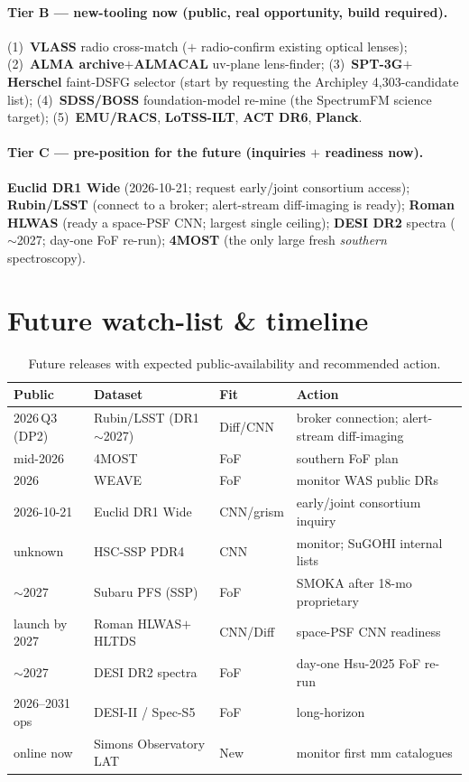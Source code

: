 \documentclass[11pt,letterpaper]{article}
\newcommand{\survey}[1]{\textbf{#1}}
\begin{document}
\paragraph{Tier B --- new-tooling now (public, real opportunity, build required).}
(1)~\survey{VLASS} radio cross-match ($+$ radio-confirm existing optical lenses);
(2)~\survey{ALMA archive}$+$\survey{ALMACAL} uv-plane lens-finder; (3)~\survey{SPT-3G}$+$%
\survey{Herschel} faint-DSFG selector (start by requesting the Archipley 4{,}303-candidate list);
(4)~\survey{SDSS/BOSS} foundation-model re-mine (the SpectrumFM science target);
(5)~\survey{EMU/RACS}, \survey{LoTSS-ILT}, \survey{ACT DR6}, \survey{Planck}.

\paragraph{Tier C --- pre-position for the future (inquiries $+$ readiness now).}
\survey{Euclid DR1 Wide} (2026-10-21; request early/joint consortium access);
\survey{Rubin/LSST} (connect to a broker; alert-stream diff-imaging is ready);
\survey{Roman HLWAS} (ready a space-PSF CNN; largest single ceiling);
\survey{DESI DR2} spectra ($\sim$2027; day-one FoF re-run);
\survey{4MOST} (the only large fresh \emph{southern} spectroscopy).

\section{Future watch-list \& timeline}
\begin{table}[h]
\centering\footnotesize
\caption{Future releases with expected public-availability and recommended action.}
\begin{tabular}{@{}llll@{}}
\toprule
Public & Dataset & Fit & Action \\ \midrule
2026\,Q3 (DP2) & Rubin/LSST (DR1 $\sim$2027) & Diff/CNN & broker connection; alert-stream diff-imaging \\
mid-2026 & 4MOST & FoF & southern FoF plan \\
2026 & WEAVE & FoF & monitor WAS public DRs \\
2026-10-21 & Euclid DR1 Wide & CNN/grism & early/joint consortium inquiry \\
unknown & HSC-SSP PDR4 & CNN & monitor; SuGOHI internal lists \\
$\sim$2027 & Subaru PFS (SSP) & FoF & SMOKA after 18-mo proprietary \\
launch by 2027 & Roman HLWAS$+$HLTDS & CNN/Diff & space-PSF CNN readiness \\
$\sim$2027 & DESI DR2 spectra & FoF & day-one Hsu-2025 FoF re-run \\
2026--2031 ops & DESI-II / Spec-S5 \citep{schlegel2025specs5} & FoF & long-horizon \\
online now & Simons Observatory LAT & New & monitor first mm catalogues \\
\bottomrule
\end{tabular}
\end{table}
\end{document}
